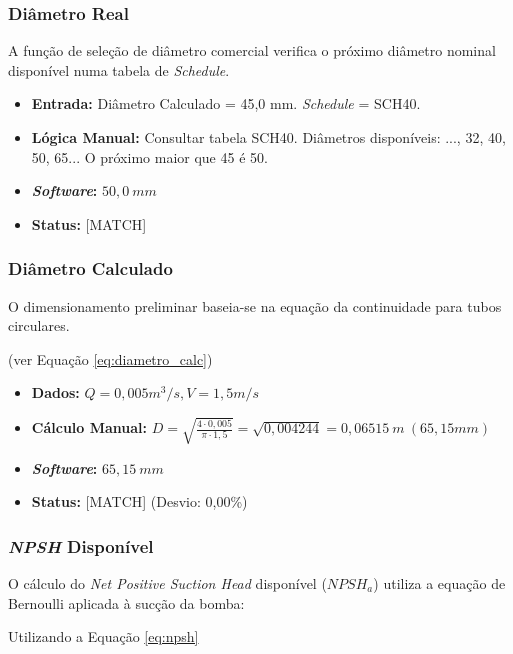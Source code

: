 \subsubsection{Diâmetro Real}
A função de seleção de diâmetro comercial verifica o próximo diâmetro nominal disponível numa tabela de \textit{Schedule}.

\begin{itemize}
    \item \textbf{Entrada:} Diâmetro Calculado = 45,0 mm. \textit{Schedule} = SCH40.
    \item \textbf{Lógica Manual:} Consultar tabela SCH40. Diâmetros disponíveis: ..., 32, 40, 50, 65... O próximo maior que 45 é 50.
    \item \textbf{\textit{Software}:} $50,0 \ mm$
    \item \textbf{Status:} [MATCH]
\end{itemize}

\subsubsection{Diâmetro Calculado}
O dimensionamento preliminar baseia-se na equação da continuidade para tubos circulares.

(ver Equação \ref{eq:diametro_calc})

\begin{itemize}
    \item \textbf{Dados:} $Q=0,005 m^3/s, V=1,5 m/s$
    \item \textbf{Cálculo Manual:} $D = \sqrt{\frac{4 \cdot 0,005}{\pi \cdot 1,5}} = \sqrt{0,004244} = 0,06515 \ m \ (65,15 mm)$
    \item \textbf{\textit{Software}:} $65,15 \ mm$
    \item \textbf{Status:} [MATCH] (Desvio: 0,00\%)
\end{itemize}

\subsubsection{\textit{NPSH} Disponível}
O cálculo do \textit{Net Positive Suction Head} disponível ($NPSH_a$) utiliza a equação de Bernoulli aplicada à sucção da bomba:

\begin{center} Utilizando a Equação \ref{eq:npsh} \end{center}

